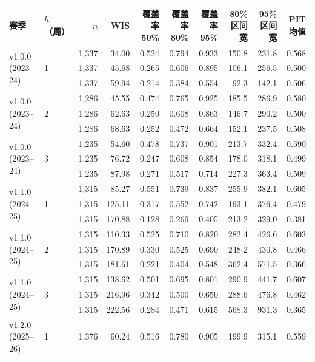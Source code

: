 \begin{tabular}{@{}llrrrrrrrr@{}}
\toprule
赛季 & $h$（周） & $n$ & WIS & 覆盖率 50\% & 覆盖率 80\% & 覆盖率 95\% & 80\% 区间宽 & 95\% 区间宽 & PIT 均值 \\
\midrule
\multirow{3}{*}{v1.0.0 (2023--24)} & \multirow{3}{*}{1} & 1,337 & 34.00 & 0.524 & 0.794 & 0.933 & 150.8 & 231.8 & 0.568 \\
& & 1,337 & 45.68 & 0.265 & 0.606 & 0.895 & 106.1 & 256.5 & 0.500 \\
& & 1,337 & 59.94 & 0.214 & 0.384 & 0.554 & 92.3 & 142.1 & 0.506 \\
\midrule
\multirow{3}{*}{v1.0.0 (2023--24)} & \multirow{3}{*}{2} & 1,286 & 45.55 & 0.474 & 0.765 & 0.925 & 185.5 & 286.9 & 0.580 \\
& & 1,286 & 62.63 & 0.250 & 0.608 & 0.863 & 146.7 & 290.2 & 0.500 \\
& & 1,286 & 68.63 & 0.252 & 0.472 & 0.664 & 152.1 & 237.5 & 0.508 \\
\midrule
\multirow{3}{*}{v1.0.0 (2023--24)} & \multirow{3}{*}{3} & 1,235 & 54.60 & 0.478 & 0.737 & 0.901 & 213.7 & 332.4 & 0.590 \\
& & 1,235 & 76.72 & 0.247 & 0.608 & 0.854 & 178.0 & 318.1 & 0.499 \\
& & 1,235 & 87.98 & 0.271 & 0.517 & 0.714 & 227.3 & 363.4 & 0.509 \\
\midrule
\multirow{3}{*}{v1.1.0 (2024--25)} & \multirow{3}{*}{1} & 1,315 & 85.27 & 0.551 & 0.739 & 0.837 & 255.9 & 382.1 & 0.605 \\
& & 1,315 & 125.11 & 0.317 & 0.552 & 0.742 & 193.1 & 376.4 & 0.479 \\
& & 1,315 & 170.88 & 0.128 & 0.269 & 0.405 & 213.2 & 329.0 & 0.381 \\
\midrule
\multirow{3}{*}{v1.1.0 (2024--25)} & \multirow{3}{*}{2} & 1,315 & 110.33 & 0.525 & 0.710 & 0.820 & 282.4 & 426.6 & 0.603 \\
& & 1,315 & 170.89 & 0.330 & 0.525 & 0.690 & 248.2 & 430.8 & 0.466 \\
& & 1,315 & 181.61 & 0.221 & 0.404 & 0.548 & 362.4 & 571.5 & 0.366 \\
\midrule
\multirow{3}{*}{v1.1.0 (2024--25)} & \multirow{3}{*}{3} & 1,315 & 138.62 & 0.501 & 0.695 & 0.801 & 290.9 & 441.7 & 0.607 \\
& & 1,315 & 216.96 & 0.342 & 0.500 & 0.650 & 288.6 & 476.8 & 0.462 \\
& & 1,315 & 222.56 & 0.284 & 0.471 & 0.615 & 568.3 & 931.3 & 0.365 \\
\midrule
\multirow{3}{*}{v1.2.0 (2025--26)} & \multirow{3}{*}{1} & 1,376 & 60.24 & 0.516 & 0.780 & 0.905 & 199.9 & 315.1 & 0.559 \\

\end{tabular}
